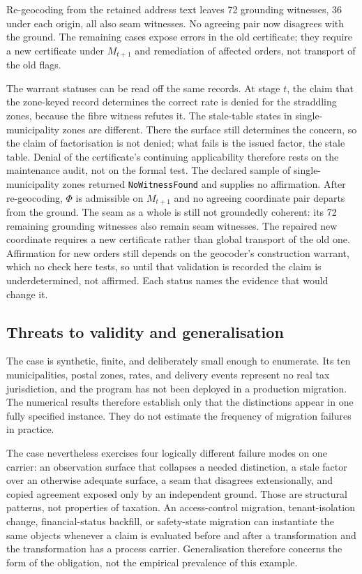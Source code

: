 \documentclass[11pt]{article}
\theoremstyle{definition}
\newcommand{\code}[1]{\texttt{#1}}
\begin{document}
Re-geocoding from the retained address text leaves 72 grounding witnesses, 36 under each origin, all also seam witnesses. No agreeing pair now disagrees with the ground. The remaining cases expose errors in the old certificate; they require a new certificate under $M_{t+1}$ and remediation of affected orders, not transport of the old flags.

The warrant statuses can be read off the same records. At stage $t$, the claim that the zone-keyed record determines the correct rate is denied for the straddling zones, because the fibre witness refutes it. The stale-table states in single-municipality zones are different. There the surface still determines the concern, so the claim of factorisation is not denied; what fails is the issued factor, the stale table. Denial of the certificate's continuing applicability therefore rests on the maintenance audit, not on the formal test. The declared sample of single-municipality zones returned \code{NoWitnessFound} and supplies no affirmation. After re-geocoding, $\Phi$ is admissible on $M_{t+1}$ and no agreeing coordinate pair departs from the ground. The seam as a whole is still not groundedly coherent: its 72 remaining grounding witnesses also remain seam witnesses. The repaired new coordinate requires a new certificate rather than global transport of the old one. Affirmation for new orders still depends on the geocoder's construction warrant, which no check here tests, so until that validation is recorded the claim is underdetermined, not affirmed. Each status names the evidence that would change it.


\subsection{Threats to validity and generalisation}\label{ex:sec:threats}
The case is synthetic, finite, and deliberately small enough to enumerate. Its ten municipalities, postal zones, rates, and delivery events represent no real tax jurisdiction, and the program has not been deployed in a production migration. The numerical results therefore establish only that the distinctions appear in one fully specified instance. They do not estimate the frequency of migration failures in practice.

The case nevertheless exercises four logically different failure modes on one carrier: an observation surface that collapses a needed distinction, a stale factor over an otherwise adequate surface, a seam that disagrees extensionally, and copied agreement exposed only by an independent ground. Those are structural patterns, not properties of taxation. An access-control migration, tenant-isolation change, financial-status backfill, or safety-state migration can instantiate the same objects whenever a claim is evaluated before and after a transformation and the transformation has a process carrier. Generalisation therefore concerns the form of the obligation, not the empirical prevalence of this example.
\end{document}
